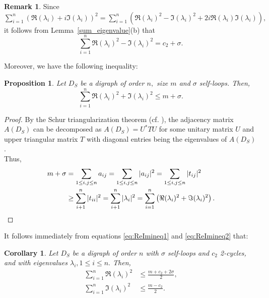 \documentclass[12pt,a4paper,reqno]{amsart}
\numberwithin{equation}{section}
\theoremstyle{plain}
\newtheorem{corollary}[theorem]{Corollary}
\newtheorem{proposition}[theorem]{Proposition}
\theoremstyle{definition}
\newtheorem{remark}[theorem]{Remark}
\newcommand{\<}{\langle}
\renewcommand{\>}{\rangle}
\begin{document}
\begin{remark}
Since $\sum_{i=1}^n \left ( \Re(\lambda_i)+i\Im(\lambda_i) \right )^2 = \sum_{i=1}^n \left( \Re(\lambda_i)^2-\Im(\lambda_i)^2 + 2i\Re(\lambda_i)\Im(\lambda_i)  \right),$ it follows from Lemma~\ref{sum_eigenvalue}(b) that
\begin{equation}\label{eq:ReImineq1}
\sum^n_{i=1} \Re(\lambda_i)^2-\Im(\lambda_i)^2 = c_2+\sigma. 
\end{equation}
\end{remark}		

Moreover, we have the following inequality:
\begin{proposition}

	\label{sum_of_re&im}
	Let $D_S$ be a digraph of order $n,$ size $m$ and $\sigma$ self-loops. Then,
	\begin{equation}\label{eq:ReImineq2}
	\sum_{i=1}^n  \Re(\lambda_i)^2+\Im(\lambda_i)^2  \leq m+\sigma.
	\end{equation}
\end{proposition} 

\begin{proof}
	By the Schur triangularization theorem (cf. \cite[Theorem 2.3.1(a)]{HornJohnson2013}), the adjacency matrix $A(D_S)$ can be decomposed as $A(D_S)=U^*TU$ for some unitary matrix $U$ and upper triangular matrix $T$ with diagonal entries being the eigenvalues of $A(D_S)$.\\
	Thus, 
	\begin{align*}
	m+\sigma &=      \sum_{1\leq i,j \leq n} a_{ij}     
	=      \sum_{1\leq i,j \leq n} |a_{ij}|^2   
	=      \sum_{1\leq i,j \leq n} |t_{ij}|^2 \\
	&\geq   \sum_{i+1}^n |t_{ii}|^2  
	=      \sum_{i+1}^n |\lambda_{i}|^2
	= \sum_{i=1}^n \left ( \Re(\lambda_i)^2+\Im(\lambda_i)^2 \right). \qedhere  
	\end{align*}
\end{proof}

 	It follows immediately from equations \eqref{eq:ReImineq1} and \eqref{eq:ReImineq2} that:
 	
	\begin{corollary} \label{ReImineq}
	Let $D_S$ be a digraph of order $n$ with $\sigma$ self-loops and $c_2$ 2-cycles, and with eigenvalues $\lambda_i, 1 \leq i \leq n.$  Then,
	\begin{align*}
		\sum_{i=1}^n  \Re(\lambda_i)^2 &\leq \frac{m + c_2 + 2\sigma}{2}, \\ 
		\sum_{i=1}^n  \Im(\lambda_i)^2 &\leq \frac{m - c_2}{2}.
	\end{align*}
		 
	\end{corollary}
	
\end{document}
